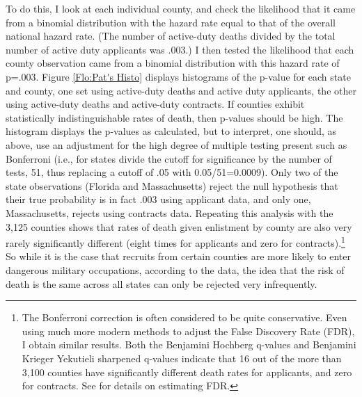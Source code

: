 \documentclass[12pt] {article}
\begin{document}
To do this, I look at each individual county, and check the likelihood that it came from a binomial distribution with the hazard rate equal to that of the overall national hazard rate. (The number of active-duty deaths divided by the total number
of active duty applicants was .003.) I then tested the likelihood
that each county observation came from a binomial distribution with this
hazard rate of p=.003. Figure \ref{Flo:Pat's Histo} displays
histograms of the p-value for each state and county, one set using active-duty deaths
and active duty applicants, the other using active-duty deaths and
active-duty contracts. If counties exhibit statistically indistinguishable rates of death, then p-values should be high. The histogram displays the p-values as calculated,
but to interpret, one should, as above, use an adjustment for the high degree of multiple testing present such as Bonferroni (i.e., for states divide the cutoff for significance by the number of tests, 51, thus replacing a cutoff of .05 with 0.05/51=0.0009). Only two
of the state observations (Florida and Massachusetts) reject the null
hypothesis that their true probability is in fact .003 using applicant
data, and only one, Massachusetts, rejects using contracts data. Repeating this analysis with the 3,125 counties shows that rates of death given enlistment by county are also very rarely significantly different (eight times for applicants and zero for contracts).\footnote{The Bonferroni correction is often considered to be quite conservative. Even using much more modern methods to adjust the False Discovery Rate (FDR), I obtain similar results. Both the Benjamini Hochberg q-values and Benjamini Krieger Yekutieli sharpened q-values indicate that 16 out of the more than 3,100 counties have significantly different death rates for applicants, and zero for contracts. See \cite{BenHoch1995, BKY2006, Anderson2008} for details on estimating FDR.} So while it is the case that recruits from certain counties are more likely to enter dangerous military occupations, according to the data, the idea that the risk of death is the same across all states can only be rejected very infrequently. 
\end{document}
